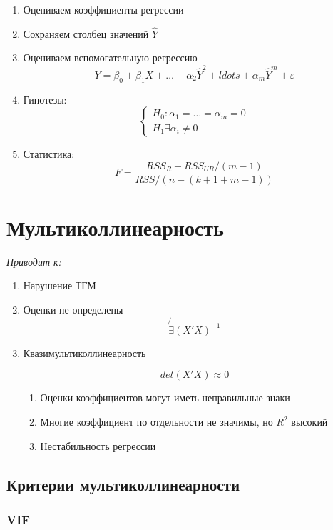 \documentclass[a4paper, 12pt]{article}
\begin{document}
\begin{enumerate}
    \item Оцениваем коэффициенты регрессии
    \item Сохраняем столбец значений $\hat{Y}$
    \item Оцениваем вспомогательную регрессию
    \[Y = \beta_0 + \beta_1 X + \ldots + \alpha_2 \hat{Y}^2 + 
    ldots + \alpha_m \hat{Y}^m + \varepsilon\]
    \item Гипотезы:
    \[
    \begin{cases}
        H_0: \alpha_1 = \ldots = \alpha_m = 0 \\
        H_1 \exists \alpha_i \neq 0
    \end{cases}
    \]
    \item Статистика:
    \[F = \frac{RSS_R - RSS_{UR} / (m - 1)}{RSS / (n - (k + 1 + m - 1))}\]
\end{enumerate}

\section{Мультиколлинеарность}

\textit{Приводит к:}

\begin{enumerate}
    \item Нарушение ТГМ
    \item Оценки не определены
    \[\not{\exists} (X'X)^{-1}\]
    \item Квазимультиколлинеарность
    
    \[det(X'X) \approx 0\]
    \begin{enumerate}
        \item Оценки коэффициентов могут 
        иметь неправильные знаки
        \item Многие коэффициент по отдельности
        не значимы, но $R^2$ высокий
        \item Нестабильность регрессии
    \end{enumerate}
\end{enumerate}

\subsection{Критерии мультиколлинеарности}

\subsubsection{VIF}
\end{document}
